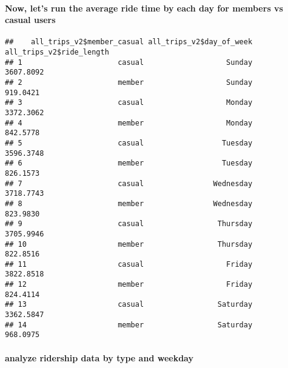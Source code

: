 \documentclass[
]{article}
\newenvironment{Shaded}{\begin{snugshade}}{\end{snugshade}}
\newcommand{\AttributeTok}[1]{\textcolor[rgb]{0.77,0.63,0.00}{#1}}
\newcommand{\FunctionTok}[1]{\textcolor[rgb]{0.00,0.00,0.00}{#1}}
\newcommand{\NormalTok}[1]{#1}
\newcommand{\SpecialCharTok}[1]{\textcolor[rgb]{0.00,0.00,0.00}{#1}}
\begin{document}
\hypertarget{now-lets-run-the-average-ride-time-by-each-day-for-members-vs-casual-users}{%
\paragraph{Now, let's run the average ride time by each day for members
vs casual
users}\label{now-lets-run-the-average-ride-time-by-each-day-for-members-vs-casual-users}}

\begin{Shaded}
\end{Shaded}

\begin{verbatim}
##    all_trips_v2$member_casual all_trips_v2$day_of_week all_trips_v2$ride_length
## 1                      casual                   Sunday                3607.8092
## 2                      member                   Sunday                 919.0421
## 3                      casual                   Monday                3372.3062
## 4                      member                   Monday                 842.5778
## 5                      casual                  Tuesday                3596.3748
## 6                      member                  Tuesday                 826.1573
## 7                      casual                Wednesday                3718.7743
## 8                      member                Wednesday                 823.9830
## 9                      casual                 Thursday                3705.9946
## 10                     member                 Thursday                 822.8516
## 11                     casual                   Friday                3822.8518
## 12                     member                   Friday                 824.4114
## 13                     casual                 Saturday                3362.5847
## 14                     member                 Saturday                 968.0975
\end{verbatim}

\hypertarget{analyze-ridership-data-by-type-and-weekday}{%
\paragraph{analyze ridership data by type and
weekday}\label{analyze-ridership-data-by-type-and-weekday}}
\end{document}
